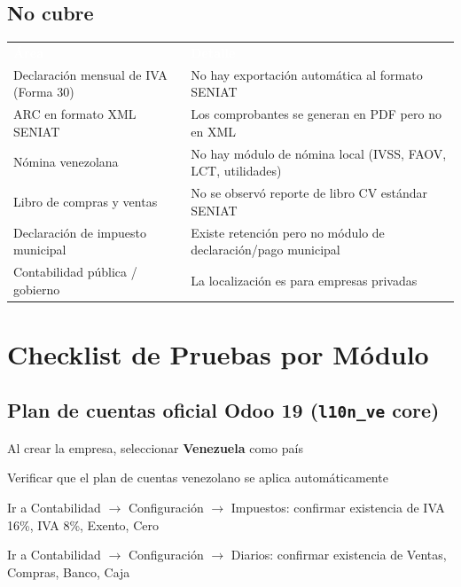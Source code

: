 \documentclass[11pt,a4paper]{article}
\newcommand{\tchead}[1]{%
  \cellcolor{naranja}\textcolor{white}{\textbf{#1}}%
}
\begin{document}
\begin{Form}
\vspace{12pt}

\subsection*{No cubre}

\begin{center}
\begin{tabular}{L{5.5cm} L{8.5cm}}
  \tchead{Área} & \tchead{Detalle} \\
  Declaración mensual de IVA (Forma 30) & No hay exportación automática al formato SENIAT \\
  ARC en formato XML SENIAT & Los comprobantes se generan en PDF pero no en XML \\
  Nómina venezolana & No hay módulo de nómina local (IVSS, FAOV, LCT, utilidades) \\
  Libro de compras y ventas & No se observó reporte de libro CV estándar SENIAT \\
  Declaración de impuesto municipal & Existe retención pero no módulo de declaración/pago municipal \\
  Contabilidad pública / gobierno & La localización es para empresas privadas \\
\end{tabular}
\end{center}

\clearpage

\section{Checklist de Pruebas por Módulo}

\subsection{Plan de cuentas oficial Odoo 19 (\texttt{l10n\_ve} core)}

\begin{checklist}
  \item Al crear la empresa, seleccionar \textbf{Venezuela} como país
  \item Verificar que el plan de cuentas venezolano se aplica automáticamente
  \item Ir a Contabilidad $\rightarrow$ Configuración $\rightarrow$ Impuestos: confirmar existencia de IVA 16\%, IVA 8\%, Exento, Cero
  \item Ir a Contabilidad $\rightarrow$ Configuración $\rightarrow$ Diarios: confirmar existencia de Ventas, Compras, Banco, Caja
\end{checklist}


\end{Form}
\end{document}
